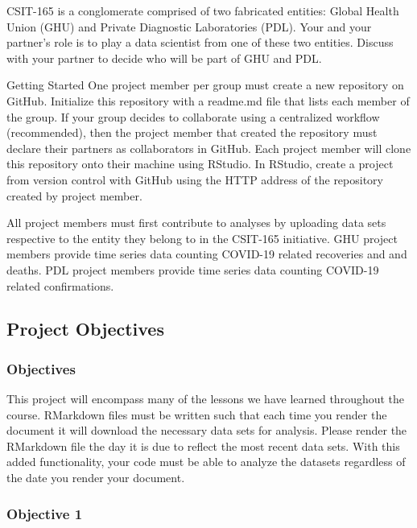 \documentclass[
]{article}
\begin{document}
CSIT-165 is a conglomerate comprised of two fabricated entities: Global
Health Union (GHU) and Private Diagnostic Laboratories (PDL). Your and
your partner's role is to play a data scientist from one of these two
entities. Discuss with your partner to decide who will be part of GHU
and PDL.

Getting Started One project member per group must create a new
repository on GitHub. Initialize this repository with a readme.md file
that lists each member of the group. If your group decides to
collaborate using a centralized workflow (recommended), then the project
member that created the repository must declare their partners as
collaborators in GitHub. Each project member will clone this repository
onto their machine using RStudio. In RStudio, create a project from
version control with GitHub using the HTTP address of the repository
created by project member.

All project members must first contribute to analyses by uploading data
sets respective to the entity they belong to in the CSIT-165 initiative.
GHU project members provide time series data counting COVID-19 related
recoveries and and deaths. PDL project members provide time series data
counting COVID-19 related confirmations.

\hypertarget{project-objectives}{%
\subsection{Project Objectives}\label{project-objectives}}

\hypertarget{objectives}{%
\subsubsection{Objectives}\label{objectives}}

This project will encompass many of the lessons we have learned
throughout the course. RMarkdown files must be written such that each
time you render the document it will download the necessary data sets
for analysis. Please render the RMarkdown file the day it is due to
reflect the most recent data sets. With this added functionality, your
code must be able to analyze the datasets regardless of the date you
render your document.

\hypertarget{objective-1}{%
\subsubsection{Objective 1}\label{objective-1}}
\end{document}
